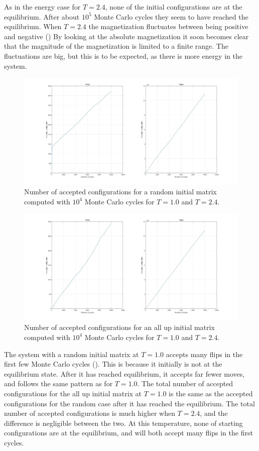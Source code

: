 \documentclass[10pt,a4paper]{article}
\begin{document}
\noindent As in the energy case for $T=2.4$, none of the initial configurations are at the equilibrium. After about $10^5$ Monte Carlo cycles they seem to have reached the equilibrium. When $T=2.4$ the magnetization fluctuates between being positive and negative () By looking at the absolute magnetization it soon becomes clear that the magnitude of the magnetization is limited to a finite range. The fluctuations are big, but this is to be expected, as there is more energy in the system. 

\begin{figure} [H]
\centerline{
\includegraphics[scale=0.245]{randomaccept.jpg}
}
\caption{Number of accepted configurations for a random initial matrix computed with $10^4$ Monte Carlo cycles for $T=1.0$ and $T=2.4$.}
\label{fig:RandomAccept}
\end{figure}

\begin{figure} [H]
\centerline{
\includegraphics[scale=0.245]{upaccept.jpg}
}
\caption{Number of accepted configurations for an all up initial matrix computed with $10^4$ Monte Carlo cycles for $T=1.0$ and $T=2.4$.}
\label{fig:UpAccept}
\end{figure}
\noindent The system with a random initial matrix at $T=1.0$ accepts many flips in the first few Monte Carlo cycles (). This is because it initially is not at the equilibrium state. After it has reached equilibrium, it accepts far fewer moves, and follows the same pattern as  for $T=1.0$. The total number of accepted configurations for the all up initial matrix at $T=1.0$ is the same as the accepted configurations for the random case after it has reached the equilibrium. The total number of accepted configurations is much higher when $T=2.4$, and the difference is negligible between the two. At this temperature, none of starting configurations are at the equilibrium, and will both accept many flips in the first cycles. 
 
\end{document}
